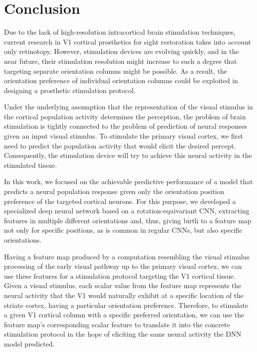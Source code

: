 \chapter*{Conclusion}

Due to the lack of high-resolution intracortical brain stimulation techniques, current research in V1 cortical prosthetics for sight restoration takes into account only retinotopy. However, stimulation devices are evolving quickly, and in the near future, their stimulation resolution might increase to such a degree that targeting separate orientation columns might be possible. As a result, the orientation preference of individual orientation columns could be exploited in designing a prosthetic stimulation protocol.

Under the underlying assumption that the representation of the visual stimulus in the cortical population activity determines the perception, the problem of brain stimulation is tightly connected to the problem of prediction of neural responses given an input visual stimulus. To stimulate the primary visual cortex, we first need to predict the population activity that would elicit the desired percept. Consequently, the stimulation device will try to achieve this neural activity in the stimulated tissue.

In this work, we focused on the achievable predictive performance of a model that predicts a neural population response given only the orientation position preference of the targeted cortical neurons. For this purpose, we developed a specialized deep neural network based on a rotation-equivariant CNN, extracting features in multiple different orientations and, thus, giving birth to a feature map not only for specific positions, as is common in regular CNNs, but also specific orientations.

Having a feature map produced by a computation resembling the visual stimulus processing of the early visual pathway up to the primary visual cortex, we can use these features for a stimulation protocol targeting the V1 cortical tissue. Given a visual stimulus, each scalar value from the feature map represents the neural activity that the V1 would naturally exhibit at a specific location of the striate cortex, having a particular orientation preference. Therefore, to stimulate a given V1 cortical column with a specific preferred orientation, we can use the feature map's corresponding scalar feature to translate it into the concrete stimulation protocol in the hope of eliciting the same neural activity the DNN model predicted.

